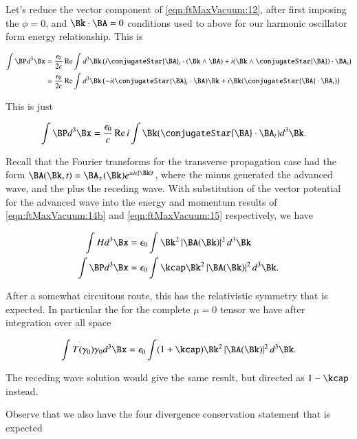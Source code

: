 Let's reduce the vector component of \autoref{eqn:ftMaxVacuum:12}, after first imposing the $\phi=0$, and $\Bk \cdot \BA = 0$ conditions used to above for our harmonic oscillator form energy relationship.  This is

\begin{align*}
\int \BP d^3 \Bx 
&=
\frac{\epsilon_0}{2 c} \Real 
\int d^3 \Bk \left( 
i \conjugateStar{\BA}_t \cdot (\Bk \wedge \BA)
+ i (\Bk \wedge \conjugateStar{\BA}) \cdot \BA_t
\right) \\
&=
\frac{\epsilon_0}{2 c} \Real 
\int d^3 \Bk \left( 
-i (\conjugateStar{\BA}_t \cdot \BA) \Bk
+ i \Bk (\conjugateStar{\BA} \cdot \BA_t)
\right)
\end{align*}

This is just

\begin{align}
\label{eqn:ftMaxVacuum:15}
\int \BP d^3 \Bx 
&=
\frac{\epsilon_0}{c} \Real 
i \int 
\Bk (\conjugateStar{\BA} \cdot \BA_t) d^3 \Bk.
\end{align}

Recall that the Fourier transforms for the transverse propagation case had the form $\BA(\Bk, t) = \BA_{\pm}(\Bk) e^{\pm i c \Abs{\Bk} t}$, where the minus generated the advanced wave, and the plus the receding wave.  With substitution of the vector potential for the advanced wave into the energy and momentum results of \autoref{eqn:ftMaxVacuum:14b} and \autoref{eqn:ftMaxVacuum:15} respectively, we have

\begin{align}\label{eqn:ftMaxVacuum:80}
\int H d^3 \Bx   &= \epsilon_0 \int \Bk^2 \Abs{\BA(\Bk)}^2 d^3 \Bk \\
\int \BP d^3 \Bx &= \epsilon_0 \int \kcap \Bk^2 \Abs{\BA(\Bk)}^2 d^3 \Bk.
\end{align}

After a somewhat circuitous route, this has the relativistic symmetry that is expected.  In particular the for the complete $\mu=0$ tensor we have after integration over all space

\begin{align}\label{eqn:ftMaxVacuum:81}
\int 
T(\gamma_0) \gamma_0 d^3 \Bx = \epsilon_0 \int (1 + \kcap) \Bk^2 \Abs{\BA(\Bk)}^2 d^3 \Bk.
\end{align}

The receding wave solution would give the same result, but directed as $1 - \kcap$ instead.

Observe that we also have the four divergence conservation statement that is expected

